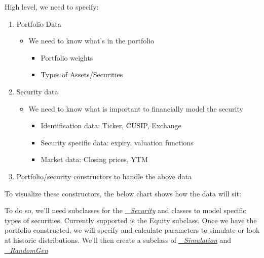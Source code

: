 \documentclass[letterpaper,10pt,english]{sphinxmanual}
\begin{document}
High level, we need to specify:
\begin{enumerate}
\item {} 
Portfolio Data
\begin{itemize}
\item {} 
We need to know what’s in the portfolio
\begin{itemize}
\item {} 
Portfolio weights

\item {} 
Types of Assets/Securities

\end{itemize}

\end{itemize}

\item {} 
Security data
\begin{itemize}
\item {} 
We need to know what is important to financially model the
security
\begin{itemize}
\item {} 
Identification data: Ticker, CUSIP, Exchange

\item {} 
Security specific data: expiry, valuation functions

\item {} 
Market data: Closing prices, YTM

\end{itemize}

\end{itemize}

\item {} 
Portfolio/security constructors to handle the above data

\end{enumerate}

To visualize these constructors, the below chart shows how the data will
sit:


To do so, we’ll need subclasses for the {\hyperref[\detokenize{gettingstarted:security}]{\emph{\_Security}}} and
 classes to model specific types
of securities. Currently supported is the Equity subclass. Once we have
the portfolio constructed, we will specify and calculate parameters to
simulate or look at historic distributions. We’ll then create a subclass
of {\hyperref[\detokenize{gettingstarted:simulation}]{\emph{\_Simulation}}} and {\hyperref[\detokenize{gettingstarted:randomgen}]{\emph{\_RandomGen}}}
\end{document}
